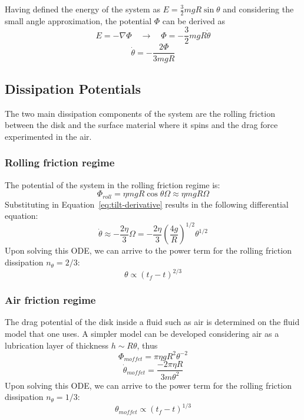 Having defined the energy of the system as $E=\frac{3}{2}mgR\sin\theta$ and considering the small angle approximation, the potential $\Phi$ can be derived as
\begin{equation}
    E=-\nabla \Phi \quad \rightarrow \quad \Phi=-\frac{3}{2}mgR\dot\theta  
\end{equation}
\begin{equation}
    \dot\theta=-\frac{2\Phi}{3mgR}
    \label{eq:tilt-derivative}
\end{equation}

\subsection{Dissipation Potentials}
The two main dissipation components of the system are the rolling friction between the disk and the surface material where it spins and the drag force experimented in the air.
\subsubsection{Rolling friction regime}
The potential of the system in the rolling friction regime is:
\begin{equation}
    \Phi_{roll}=\eta m g R \cos{\theta}\Omega\approx\eta mgR\Omega
\end{equation}
Substituting in Equation~\ref{eq:tilt-derivative} results in the following differential equation:
\begin{equation}
    \dot\theta\approx-\frac{2\eta}{3}\Omega=-\frac{2\eta}{3} \left( \frac{4g}{R} \right)^{1/2}\theta^{1/2}
\end{equation}
Upon solving this ODE, we can arrive to the power term for the rolling friction dissipation $n_{\theta}=2/3$:
\begin{equation}
    \theta\propto(t_f-t)^{2/3}
\end{equation}

\subsubsection{Air friction regime}
The drag potential of the disk inside a fluid such as air is determined on the fluid model that one uses. A simpler model\cite{Moffatt2000} can be developed considering air as a lubrication layer of thickness $h\sim R\theta$, thus
\begin{equation}
    \Phi_{moffet}=\pi\eta gR^2\theta^{-2}
\end{equation}
\begin{equation}
    \dot\theta_{moffet}=\frac{-2\pi\eta R}{3m\theta^2}
\end{equation}
Upon solving this ODE, we can arrive to the power term for the rolling friction dissipation $n_{\theta}=1/3$:
\begin{equation}
    \theta_{moffet}\propto(t_f-t)^{1/3}
\end{equation}

